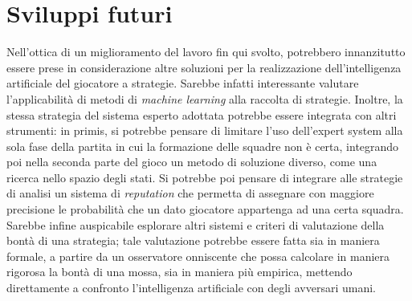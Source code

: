 \section{Sviluppi futuri}

Nell'ottica di un miglioramento del lavoro fin qui svolto, potrebbero innanzitutto essere prese in considerazione altre soluzioni per la realizzazione dell'intelligenza artificiale del giocatore a strategie. Sarebbe infatti interessante valutare l'applicabilità di metodi di \emph{machine learning} alla raccolta di strategie. Inoltre, la stessa strategia del sistema esperto adottata potrebbe essere integrata con altri strumenti: in primis, si potrebbe pensare di limitare l'uso dell'expert system alla sola fase della partita in cui la formazione delle squadre non è certa, integrando poi nella seconda parte del gioco un metodo di soluzione diverso, come una ricerca nello spazio degli stati. Si potrebbe poi pensare di integrare alle strategie di analisi un sistema di \emph{reputation} che permetta di assegnare con maggiore precisione le probabilità che un dato giocatore appartenga ad una certa squadra.\\
Sarebbe infine auspicabile esplorare altri sistemi e criteri di valutazione della bontà di una strategia; tale valutazione potrebbe essere fatta sia in maniera formale, a partire da un osservatore onniscente che possa calcolare in maniera rigorosa la bontà di una mossa, sia in maniera più empirica, mettendo direttamente a confronto l'intelligenza artificiale con degli avversari umani.\\





